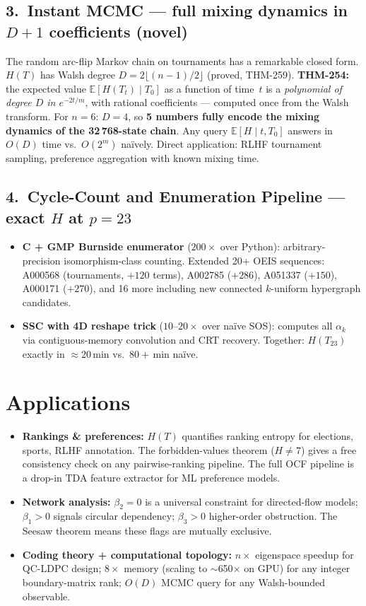 \documentclass[10pt,letterpaper]{article}
\begin{document}
\subsection*{3.\ Instant MCMC — full mixing dynamics in $D{+}1$ coefficients \textnormal{(novel)}}

The random arc-flip Markov chain on tournaments has a remarkable closed form.
$H(T)$ has Walsh degree $D = 2\lfloor(n-1)/2\rfloor$ (proved, THM-259).
\textbf{THM-254:} the expected value $\mathbb{E}[H(T_t)\mid T_0]$ as a function of
time~$t$ is a \emph{polynomial of degree $D$ in $e^{-2t/m}$}, with rational
coefficients — computed once from the Walsh transform.
For $n=6$: $D=4$, so \textbf{5 numbers fully encode the mixing dynamics of the
32\,768-state chain}. Any query $\mathbb{E}[H\mid t, T_0]$ answers in $O(D)$ time vs.\
$O(2^m)$ na\"ively. Direct application: RLHF tournament sampling,
preference aggregation with known mixing time.

\subsection*{4.\ Cycle-Count and Enumeration Pipeline — exact $H$ at $p=23$}

\begin{itemize}
  \item \textbf{C + GMP Burnside enumerator} ($200\times$ over Python): arbitrary-precision
    isomorphism-class counting. Extended 20+ OEIS sequences:
    A000568 (tournaments, $+120$ terms), A002785 ($+286$), A051337 ($+150$),
    A000171 ($+270$), and 16 more including new connected $k$-uniform hypergraph candidates.
  \item \textbf{SSC with 4D reshape trick} ($10$--$20\times$ over na\"ive SOS):
    computes all $\alpha_k$ via contiguous-memory convolution and CRT recovery.
    Together: $H(T_{23})$ exactly in $\approx$20\,min vs.\ $80+$\,min na\"ive.
\end{itemize}

\section{Applications}

\begin{itemize}
  \item \textbf{Rankings \& preferences:} $H(T)$ quantifies ranking entropy for elections,
    sports, RLHF annotation. The forbidden-values theorem ($H\neq 7$) gives a
    free consistency check on any pairwise-ranking pipeline.
    The full OCF pipeline is a drop-in TDA feature extractor for ML preference models.
  \item \textbf{Network analysis:} $\beta_2=0$ is a universal constraint for directed-flow
    models; $\beta_1>0$ signals circular dependency; $\beta_3>0$ higher-order obstruction.
    The Seesaw theorem means these flags are mutually exclusive.
  \item \textbf{Coding theory + computational topology:} $n\times$ eigenspace speedup for
    QC-LDPC design; $8\times$ memory (scaling to $\sim$650$\times$ on GPU) for any
    integer boundary-matrix rank; $O(D)$ MCMC query for any Walsh-bounded observable.
\end{itemize}
\end{document}
